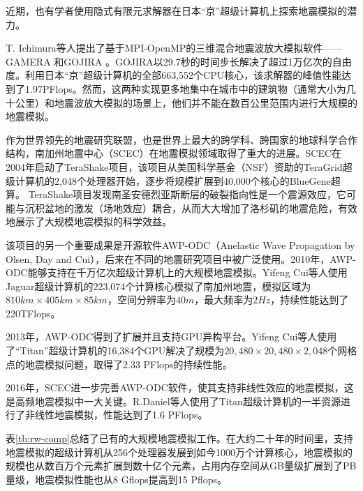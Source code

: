 \documentclass[degree=doctor]{thuthesis}
\begin{document}
近期，也有学者使用隐式有限元求解器\cite{geradin1983implicit}在日本“京”超级计算机\cite{yokokawa2011k}上探索地震模拟的潜力。

T. Ichimura等人提出了基于MPI-OpenMP的三维混合地震波放大模拟软件——GAMERA \citep {ichimura2014physics}和GOJIRA \citep {ichimura2015implicit}。GOJIRA以29.7秒的时间步长解决了超过1万亿次的自由度。利用日本“京”超级计算机的全部663,552个CPU核心，该求解器的峰值性能达到了1.97PFlops。然而，这两种实现更多地集中在城市中的建筑物（通常大小为几十公里）和地震波放大模拟的场景上，他们并不能在数百公里范围内进行大规模的地震模拟。

作为世界领先的地震研究联盟，也是世界上最大的跨学科、跨国家的地球科学合作结构，南加州地震中心（SCEC）在地震模拟领域取得了重大的进展。SCEC在2004年启动了TeraShake项目，该项目从美国科学基金（NSF）资助的TeraGrid超级计算机\citep{teragrid}的2,048个处理器开始，逐步将规模扩展到40,000个核心的BlueGene超算\cite{adiga2002overview}。
TeraShake项目发现南圣安德烈亚斯断层的破裂指向性是一个震源效应，它可能与沉积盆地的激发（场地效应）耦合，从而大大增加了洛杉矶的地震危险，有效地展示了大规模地震模拟的科学效益。

该项目的另一个重要成果是开源软件AWP-ODC\cite{awpodc}（Anelastic Wave Propagation by Olsen, Day and Cui），后来在不同的地震研究项目中被广泛使用。2010年，AWP-ODC能够支持在千万亿次超级计算机上的大规模地震模拟\citep{cui2010scalable}。Yifeng Cui等人使用Jaguar超级计算机的223,074个计算核心模拟了南加州地震，模拟区域为$810km\times 405km\times 85km$，空间分辨率为$40m$，最大频率为$2Hz$，持续性能达到了220TFlops。

2013年，AWP-ODC得到了扩展并且支持GPU异构平台。Yifeng Cui等人使用了“Titan”超级计算机的16,384个GPU解决了规模为$20,480\times20,480\times2,048$个网格点的地震模拟问题，取得了2.33 PFlops的持续性能。

2016年，SCEC进一步完善AWP-ODC软件，使其支持非线性效应的地震模拟，这是高频地震模拟中一大关键。R.Daniel等人使用了Titan超级计算机的一半资源进行了非线性地震模拟\citep{roten2016high}，性能达到了1.6 PFlops。

表\ref{tb:rw-comp}总结了已有的大规模地震模拟工作。在大约二十年的时间里，支持地震模拟的超级计算机从256个处理器发展到如今1000万个计算核心，地震模拟的规模也从数百万个元素扩展到数十亿个元素，占用内存空间从GB量级扩展到了PB量级，地震模拟性能也从8 Gflops提高到15 Pflops。
\end{document}
